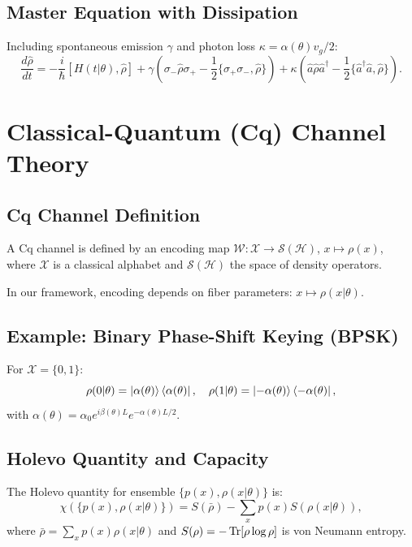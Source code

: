 \documentclass[12pt]{article}
\begin{document}
\subsection{Master Equation with Dissipation}
Including spontaneous emission $\gamma$ and photon loss $\kappa = \alpha(\theta) v_g / 2$:
\begin{equation}
    \frac{d\hat{\rho}}{dt} = -\frac{i}{\hbar} [H(t|\theta), \hat{\rho}] 
    + \gamma \left( \sigma_- \hat{\rho} \sigma_+ - \frac{1}{2} \{\sigma_+\sigma_-, \hat{\rho}\} \right)
    + \kappa \left( \hat{a} \hat{\rho} \hat{a}^\dagger - \frac{1}{2} \{\hat{a}^\dagger \hat{a}, \hat{\rho}\} \right).
\end{equation}

\section{Classical-Quantum (Cq) Channel Theory}
\subsection{Cq Channel Definition}
A Cq channel is defined by an encoding map $\mathcal{W}: \mathcal{X} \to \mathcal{S}(\mathcal{H})$, $x \mapsto \rho(x)$, where $\mathcal{X}$ is a classical alphabet and $\mathcal{S}(\mathcal{H})$ the space of density operators.

In our framework, encoding depends on fiber parameters: $x \mapsto \rho(x|\theta)$.

\subsection{Example: Binary Phase-Shift Keying (BPSK)}
For $\mathcal{X} = \{0,1\}$:
\begin{equation}
    \rho(0|\theta) = \ket{\alpha(\theta)}\bra{\alpha(\theta)}, \quad 
    \rho(1|\theta) = \ket{-\alpha(\theta)}\bra{-\alpha(\theta)},
\end{equation}
with $\alpha(\theta) = \alpha_0 e^{i\beta(\theta)L} e^{-\alpha(\theta)L/2}$.

\subsection{Holevo Quantity and Capacity}
The Holevo quantity for ensemble $\{p(x), \rho(x|\theta)\}$ is:
\begin{equation}
    \chi(\{p(x), \rho(x|\theta)\}) = S(\bar{\rho}) - \sum_x p(x) S(\rho(x|\theta)),
\end{equation}
where $\bar{\rho} = \sum_x p(x) \rho(x|\theta)$ and $S(\rho) = -\Tr[\rho \log \rho]$ is von Neumann entropy.
\end{document}
